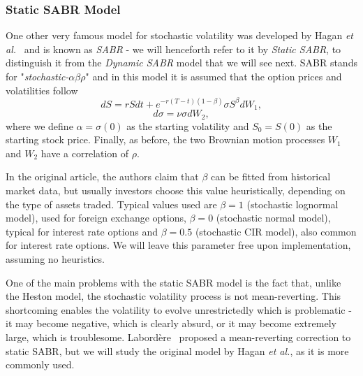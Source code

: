 \subsubsection{Static SABR Model}
One other very famous model for stochastic volatility was developed by Hagan \textit{et al.}~\cite{Hagan} and is known as \emph{SABR} - we will henceforth refer to it by \emph{Static SABR}, to distinguish it from the \emph{Dynamic SABR} model that we will see next. SABR stands for "\emph{stochastic-}$\alpha\beta\rho$" and in this model it is assumed that the option prices and volatilities follow~\cite{Geeske}
\begin{equation}\label{dF}
dS=rSdt+e^{-r(T-t)(1-\beta)}\sigma S^\beta dW_1,
\end{equation}
\begin{equation}\label{dsigma}
d\sigma=\nu\sigma dW_2,
\end{equation}
\noindent where we define $\alpha=\sigma(0)$ as the starting volatility and $S_0=S(0)$ as the starting stock price. Finally, as before, the two Brownian motion processes $W_1$ and $W_2$ have a correlation of $\rho$.




In the original article, the authors claim that $\beta$ can be fitted from historical market data, but usually investors choose this value heuristically, depending on the type of assets traded. Typical values used are $\beta=1$ (stochastic lognormal model), used for foreign exchange options, $\beta=0$ (stochastic normal model), typical for interest rate options and $\beta=0.5$ (stochastic CIR model), also common for interest rate options.
We will leave this parameter free upon implementation, assuming no heuristics.

One of the main problems with the static SABR model is the fact that, unlike the Heston model, the stochastic volatility process is not mean-reverting. This shortcoming enables the volatility to evolve unrestrictedly which is problematic - it may become negative, which is clearly absurd, or it may become extremely large, which is troublesome. Labordère~\cite{Labordere} proposed a mean-reverting correction to static SABR, but we will study the original model by Hagan \textit{et al.}, as it is more commonly used.

